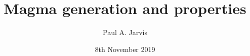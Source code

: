 \documentclass{beamer}
\title[Modeling volcanic processes]{Magma generation and properties} %
\author[Paul Jarvis]{Paul A. Jarvis} %
\institute[UNIGE] %
{
\textit{paul.jarvis@unige.ch} %
}
\date{8th November 2019} %
\begin{document}
\begin{frame}
\titlepage %
\end{frame}





\end{document}
